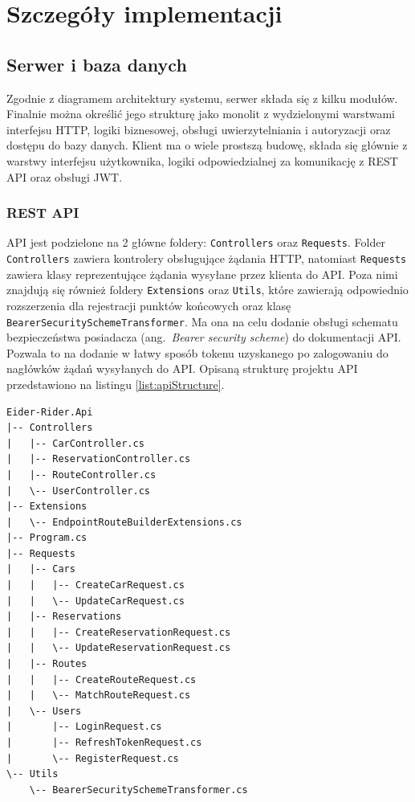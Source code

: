 \chapter{Szczegóły implementacji}
\section{Serwer i baza danych}
Zgodnie z diagramem architektury systemu, serwer składa się z kilku modułów. 
Finalnie można określić jego strukturę jako monolit z wydzielonymi warstwami interfejsu HTTP, logiki biznesowej, obsługi uwierzytelniania i autoryzacji oraz dostępu do bazy danych.
Klient ma o wiele prostszą budowę, składa się głównie z warstwy interfejsu użytkownika, logiki odpowiedzialnej za komunikację z REST API oraz obsługi JWT.
\subsection{REST API}
API jest podzielone na 2 główne foldery: \texttt{Controllers} oraz \texttt{Requests}. 
Folder \texttt{Controllers} zawiera kontrolery obsługujące żądania HTTP, natomiast \texttt{Requests} zawiera klasy reprezentujące żądania wysyłane przez klienta do API.
Poza nimi znajdują się również foldery \texttt{Extensions} oraz \texttt{Utils}, które zawierają odpowiednio rozszerzenia dla rejestracji punktów końcowych oraz klasę \texttt{BearerSecuritySchemeTransformer}.
Ma ona na celu dodanie obsługi schematu bezpieczeństwa posiadacza (ang.~\emph{Bearer security scheme}) do dokumentacji API. 
Pozwala to na dodanie w łatwy sposób tokenu uzyskanego po zalogowaniu do nagłówków żądań wysyłanych do API.
Opisaną strukturę projektu API przedstawiono na listingu \ref{list:apiStructure}.

\begin{lstlisting}[label=list:apiStructure,caption=Struktura projektu API,style=folderview]
Eider-Rider.Api
|-- Controllers
|   |-- CarController.cs
|   |-- ReservationController.cs
|   |-- RouteController.cs
|   \-- UserController.cs
|-- Extensions
|   \-- EndpointRouteBuilderExtensions.cs
|-- Program.cs
|-- Requests
|   |-- Cars
|   |   |-- CreateCarRequest.cs
|   |   \-- UpdateCarRequest.cs
|   |-- Reservations
|   |   |-- CreateReservationRequest.cs
|   |   \-- UpdateReservationRequest.cs
|   |-- Routes
|   |   |-- CreateRouteRequest.cs
|   |   \-- MatchRouteRequest.cs
|   \-- Users
|       |-- LoginRequest.cs
|       |-- RefreshTokenRequest.cs
|       \-- RegisterRequest.cs
\-- Utils
    \-- BearerSecuritySchemeTransformer.cs
\end{lstlisting}

